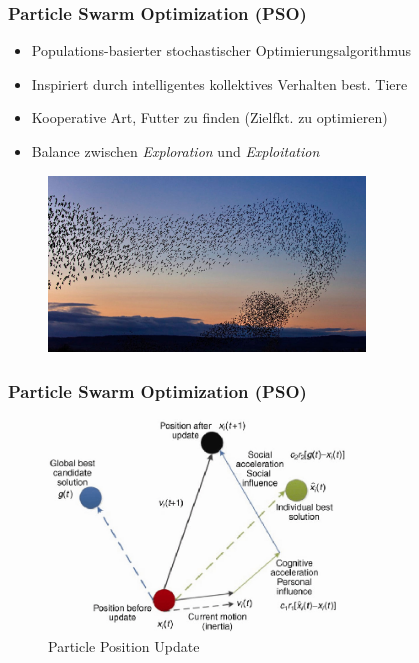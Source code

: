 \documentclass{beamer}
\begin{document}
\begin{frame}
  \frametitle{Particle Swarm Optimization (PSO)}
  \begin{itemize}
    \item Populations-basierter stochastischer Optimierungsalgorithmus
    \item Inspiriert durch intelligentes kollektives Verhalten best. Tiere
    \item Kooperative Art, Futter zu finden (Zielfkt. zu optimieren)
    \item Balance zwischen \textit{Exploration} und \textit{Exploitation}
  \end{itemize}
  \begin{figure}
    \centering
    \includegraphics[width=0.75\textwidth]{img/birds.jpg}
  \end{figure}
\end{frame}

\begin{frame}
  \frametitle{Particle Swarm Optimization (PSO)}
  \begin{figure}
    \includegraphics[width=0.7\textwidth]{img/PSO.png}
  \caption*{Particle Position Update}
  \end{figure}
\end{frame}
\end{document}
